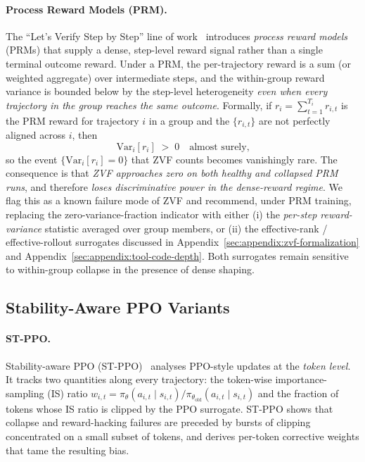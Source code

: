 \paragraph{Process Reward Models (PRM).}
The ``Let's Verify Step by Step'' line of work~\cite{lightman2023prm}
introduces \emph{process reward models} (PRMs) that supply a dense, step-level
reward signal rather than a single terminal outcome reward. Under a PRM, the
per-trajectory reward is a sum (or weighted aggregate) over intermediate
steps, and the within-group reward variance is bounded below by the
step-level heterogeneity \emph{even when every trajectory in the group reaches
the same outcome}. Formally, if $r_i = \sum_{t=1}^{T_i} r_{i,t}$ is the PRM
reward for trajectory $i$ in a group and the $\{r_{i,t}\}$ are not perfectly
aligned across $i$, then
\begin{equation}
\mathrm{Var}_i\!\left[r_i\right] \;>\; 0
\quad\text{almost surely,}
\end{equation}
so the event $\{\mathrm{Var}_i[r_i] = 0\}$ that ZVF counts becomes vanishingly
rare. The consequence is that \emph{ZVF approaches zero on both healthy and
collapsed PRM runs}, and therefore \emph{loses discriminative power in the
dense-reward regime}. We flag this as a known failure mode of ZVF and
recommend, under PRM training, replacing the zero-variance-fraction indicator
with either (i) the \emph{per-step reward-variance} statistic averaged over
group members, or (ii) the effective-rank / effective-rollout surrogates
discussed in Appendix~\ref{sec:appendix:zvf-formalization} and
Appendix~\ref{sec:appendix:tool-code-depth}. Both surrogates remain
sensitive to within-group collapse in the presence of dense shaping.

\subsection{Stability-Aware PPO Variants}
\label{sec:ext:stppo}

\paragraph{ST-PPO.}
Stability-aware PPO (ST-PPO)~\cite{stppo2025} analyses PPO-style updates at the
\emph{token level}. It tracks two quantities along every trajectory: the
token-wise importance-sampling (IS) ratio
$w_{i,t} = \pi_\theta(a_{i,t}\mid s_{i,t}) / \pi_{\theta_\mathrm{old}}(a_{i,t}\mid s_{i,t})$
and the fraction of tokens whose IS ratio is clipped by the PPO surrogate.
ST-PPO shows that collapse and reward-hacking failures are preceded by bursts
of clipping concentrated on a small subset of tokens, and derives per-token
corrective weights that tame the resulting bias.

